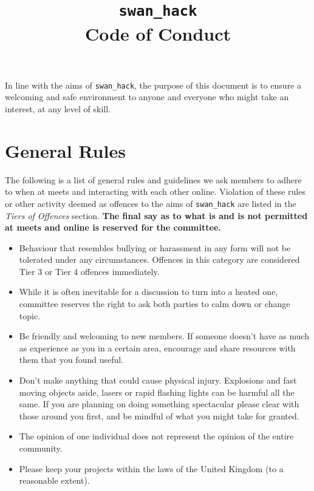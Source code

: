\documentclass[12pt]{extarticle}
\title{\vspace{-2cm}\texttt{swan\_hack} \\ {Code of Conduct}\vspace{-1cm}}
\date{}
\begin{document}
	\maketitle
	In line with the aims of \texttt{swan\_hack}, the purpose of this document is to ensure a welcoming and safe environment to anyone and everyone who might take an interest, at any level of skill. 
	
	\section{General Rules}
	The following is a list of general rules and guidelines we ask members to adhere to when at meets and interacting with each other online. Violation of these rules or other activity deemed as offences to the aims of \texttt{swan\_hack} are listed in the \emph{Tiers of Offences} section.
    \textbf{The final say as to what is and is not permitted at meets and online is reserved for the committee.}
    
	\begin{itemize}
		\item Behaviour that resembles bullying or harassment in any form will not be tolerated under any circumstances. Offences in this category are considered Tier 3 or Tier 4 offences immediately.
		\item While it is often inevitable for a discussion to turn into a heated one, committee reserves the right to ask both parties to calm down or change topic.
		\item Be friendly and welcoming to new members. If someone doesn't have as much as experience as you in a certain area, encourage and share resources with them that you found useful.
		\item Don't make anything that could cause physical injury. Explosions and fast moving objects aside, lasers or rapid flashing lights can be harmful all the same. If you are planning on doing something spectacular please clear with those around you first, and be mindful of what you might take for granted.
		\item The opinion of one individual does not represent the opinion of the entire community.
		\item Please keep your projects within the laws of the United Kingdom (to a reasonable extent).
	\end{itemize}   
	
\end{document}
